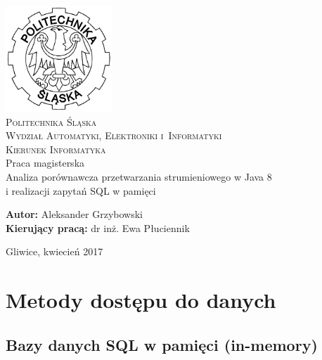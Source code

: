 \documentclass[12pt]{extarticle}
\begin{document}
\begin{titlepage}
    \begin{center}
        \includegraphics[width=4cm]{polsl.png}\\[1cm]
        \textsc{\LARGE{Politechnika Śląska}}\\[0.5cm]
        \textsc{\LARGE{Wydział Automatyki, Elektroniki i~Informatyki}}\\[0.5cm]
        \textsc{\LARGE{Kierunek Informatyka}}\\[2.5cm]
        \LARGE{Praca magisterska}\\[1cm]
        \begingroup
            \fontsize{14pt}{17pt}\selectfont
            Analiza porównawcza przetwarzania strumieniowego w Java 8 \\ i realizacji zapytań SQL w pamięci
        \endgroup
    \end{center}
    \vspace{2cm}
    \begingroup
        \fontsize{14pt}{17pt}\selectfont
        \textbf{Autor:} Aleksander Grzybowski\\
        \textbf{Kierujący pracą:} dr inż. Ewa Płuciennik\\
    \endgroup

    \vspace{3.0cm}
    \begingroup
        \fontsize{12pt}{14pt}\selectfont
        \begin{center}
        Gliwice, kwiecień 2017
        \end{center}
    \endgroup
\end{titlepage}

\clearpage

\tableofcontents

\newpage

\section{Metody dostępu do danych}

\subsection{Bazy danych SQL w pamięci (in-memory)}
\end{document}
